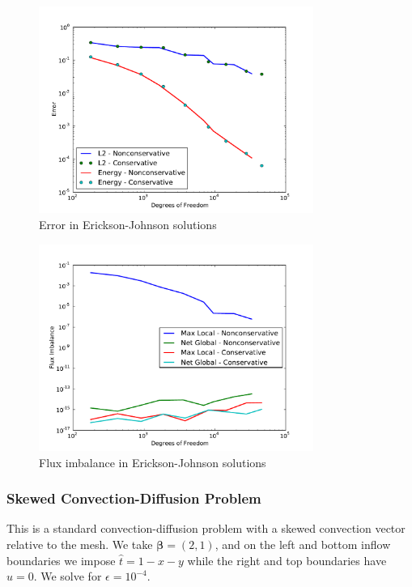 \documentclass[letterpaper]{article}
\def\bbeta{\boldsymbol\beta}
\begin{document}
\begin{figure}[p]
\centering
\includegraphics[width=0.8\textwidth]{figs/Erickson/modifiedError.pdf}
\caption{Error in Erickson-Johnson solutions}
\label{fig:ericksonError}
\end{figure}

\begin{figure}[h!]
\centering
\includegraphics[width=0.8\textwidth]{figs/Erickson/modifiedFlux.pdf}
\caption{Flux imbalance in Erickson-Johnson solutions}
\label{ericksonFlux}
\end{figure}

\subsubsection{Skewed Convection-Diffusion Problem}
This is a standard convection-diffusion problem with a skewed convection
vector relative to the mesh. We take $\bbeta=(2,1)$, and on the left and
bottom inflow boundaries we impose $\hat t=1-x-y$ while the right and top
boundaries have $\hat u=0$. We solve for $\epsilon=10^{-4}$.
\end{document}
